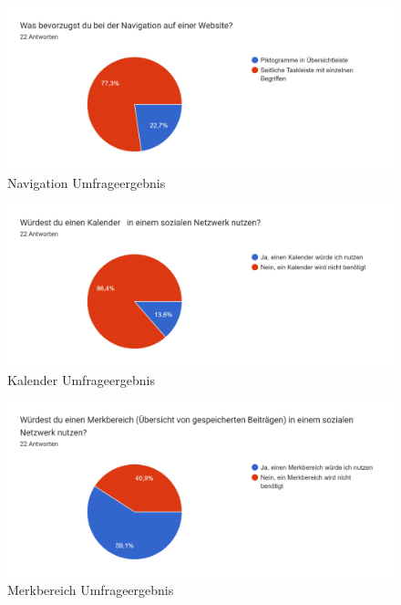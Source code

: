 \begin{figure}[!htb]
    \centering
    \includegraphics[width=1\textwidth]{figures/daniel/Bild-8.png}
    \caption[shortcaption]{Navigation Umfrageergebnis}
    \label{fig:bild8}
\end{figure}

\begin{figure}[!htb]
    \centering
    \includegraphics[width=1\textwidth]{figures/daniel/Bild-9.png}
    \caption[shortcaption]{Kalender Umfrageergebnis}
    \label{fig:bild9}
\end{figure}

\begin{figure}[!htb]
    \centering
    \includegraphics[width=1\textwidth]{figures/daniel/Bild-10.png}
    \caption[shortcaption]{Merkbereich Umfrageergebnis}
    \label{fig:bild10}
\end{figure}

